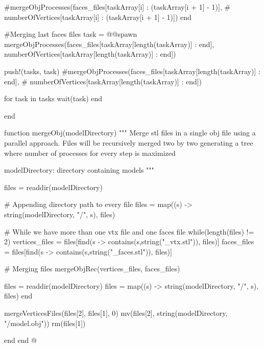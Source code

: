 \documentclass[11pt,oneside]{article}	%
\begin{document}
{    #mergeObjProcesses(faces_files[taskArray[i] : (taskArray[i + 1] - 1)],
    #                  numberOfVertices[taskArray[i] : (taskArray[i + 1] - 1)])
  end
  
  #Merging last faces files
  task = @@spawn mergeObjProcesses(faces_files[taskArray[length(taskArray)] : end],
                                  numberOfVertices[taskArray[length(taskArray)] : end])

  push!(tasks, task)
  #mergeObjProcesses(faces_files[taskArray[length(taskArray)] : end],
  #                    numberOfVertices[taskArray[length(taskArray)] : end])
  
  for task in tasks
    wait(task)
  end

end

function mergeObj(modelDirectory)
  """
  Merge stl files in a single obj file using a parallel
  approach. Files will be recursively merged two by two
  generating a tree where number of processes for every
  step is maximized

  modelDirectory: directory containing models
  """

  files = readdir(modelDirectory)
  
  # Appending directory path to every file
  files = map((s) -> string(modelDirectory, "/", s), files)
  
  # While we have more than one vtx file and one faces file
  while(length(files) != 2)
    vertices_files = files[find(s -> contains(s,string("_vtx.stl")), files)]
    faces_files = files[find(s -> contains(s,string("_faces.stl")), files)]
  
    # Merging files
    mergeObjRec(vertices_files, faces_files)
    
    files = readdir(modelDirectory)
    files = map((s) -> string(modelDirectory, "/", s), files)
  end
  
  mergeVerticesFiles(files[2], files[1], 0)
  mv(files[2], string(modelDirectory, "/model.obj"))
  rm(files[1])

end
end
@}
\end{document}

